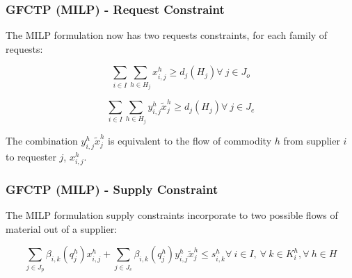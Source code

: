\begin{frame}[ctb!]
  \frametitle{GFCTP (MILP) - Request Constraint} 

  The MILP formulation now has two requests constraints, for each family of
  requests:

  \begin{equation}
    \sum_{i \in I}\sum_{h \in H_{j}} x_{i,j}^{h} \geq d_{j}(H_{j})
    \forall \: j \in J_{o}
  \end{equation}
  
  \begin{equation}    
    \sum_{i \in I}\sum_{h \in H_{j}} y_{i,j}^{h} \tilde{x}_{j}^{h} \geq d_{j}(H_{j}) 
    \forall \: j \in J_{e}
  \end{equation}

  The combination $y_{i,j}^{h} \tilde{x}_{j}^{h}$ is equivalent to the flow of
  commodity $h$ from supplier $i$ to requester $j$, $x^h_{i,j}$.
\end{frame}

\begin{frame}[ctb!]
  \frametitle{GFCTP (MILP) - Supply Constraint} 

  The MILP formulation supply constraints incorporate to two possible flows of
  material out of a supplier:
  
  \begin{equation}    
    \sum_{j \in J_{p}}\beta_{i,k}(q_{j}^{h}) x_{i,j}^{h}
    + \sum_{j \in J_{e}}\beta_{i,k}(q_{j}^{h}) y_{i,j}^{h} \tilde{x}_{j}^{h} \leq s_{i,k}^{h}
    \forall \: i \in I, \: \forall \: k \in K_{i}^{h}, \forall \: {h \in H}
  \end{equation}
  
\end{frame}

